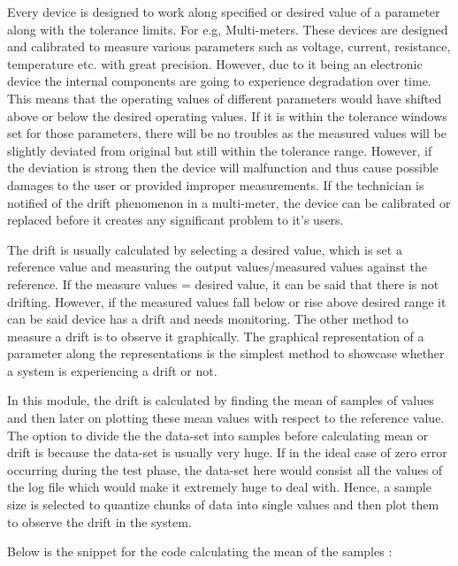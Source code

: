 Every device is designed to work along specified or desired value of a parameter along with the tolerance limits. For e.g, Multi-meters. These devices are designed and calibrated to measure various parameters such as voltage, current, resistance, temperature etc. with great precision. However, due to it being an electronic device the internal components are going to experience degradation over time. This means that the operating values of different parameters would have shifted above or below the desired operating values. If it is within the tolerance windows set for those parameters, there will be no troubles as the measured values will be slightly deviated from original but still within the tolerance range. However, if the deviation is strong then the device will malfunction and thus cause possible damages to the user or provided improper measurements. If the technician is notified of the drift phenomenon in a multi-meter, the device can be calibrated or replaced before it creates any significant problem to it's users.

The drift is usually calculated by selecting a desired value, which is set a reference value and measuring the output values/measured values against the reference. If the measure values = desired value, it can be said that there is not drifting. However, if the measured values fall below or rise above desired range it can be said device has a drift and needs monitoring. The other method to measure a drift is to observe it graphically. The graphical representation of a parameter along the representations is the simplest method to showcase whether a system is experiencing a drift or not.

In this module, the drift is calculated by finding the mean of samples of values and then later on plotting these mean values with respect to the reference value. The option to divide the the data-set into samples before calculating mean or drift is because the data-set is usually very huge. If in the ideal case of zero error occurring during the test phase, the data-set here would consist all the values of the log file which would make it extremely huge to deal with. Hence, a sample size is selected to quantize chunks of data into single values and then plot them to observe the drift in the system. 

Below is the snippet for the code calculating the mean of the samples : 

